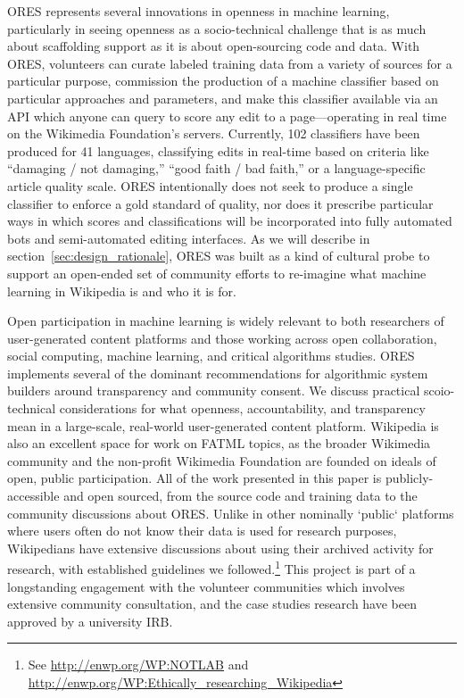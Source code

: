 ORES represents several innovations in openness in machine learning, particularly in seeing openness as a socio-technical challenge that is as much about scaffolding support as it is about open-sourcing code and data. With ORES, volunteers can curate labeled training data from a variety of sources for a particular purpose, commission the production of a machine classifier based on particular approaches and parameters, and make this classifier available via an API which anyone can query to score any edit to a page---operating in real time on the Wikimedia Foundation's servers. Currently, 102 classifiers have been produced for 41 languages, classifying edits in real-time based on criteria like ``damaging / not damaging,'' ``good faith / bad faith,'' or a language-specific article quality scale. ORES intentionally does not seek to produce a single classifier to enforce a gold standard of quality, nor does it prescribe particular ways in which scores and classifications will be incorporated into fully automated bots and semi-automated editing interfaces. As we will describe in section~\ref{sec:design_rationale}, ORES was built as a kind of cultural probe \cite{hutchinson2003technology} to support an open-ended set of community efforts to re-imagine what machine learning in Wikipedia is and who it is for.

Open participation in machine learning is widely relevant to both researchers of user-generated content platforms and those working across open collaboration, social computing, machine learning, and critical algorithms studies. ORES implements several of the dominant recommendations for algorithmic system builders around transparency and community consent\cite{crawford2016algorithm,diakopoulos2015algorithmic,sandvig2014auditing}. We discuss practical scoio-technical considerations for what openness, accountability, and transparency mean in a large-scale, real-world user-generated content platform. Wikipedia is also an excellent space for work on FATML topics, as the broader Wikimedia community and the non-profit Wikimedia Foundation are founded on ideals of open, public participation. All of the work presented in this paper is publicly-accessible and open sourced, from the source code and training data to the community discussions about ORES. Unlike in other nominally `public` platforms where users often do not know their data is used for research purposes, Wikipedians have extensive discussions about using their archived activity for research, with established guidelines we followed.\footnote{See \url{http://enwp.org/WP:NOTLAB} and \url{http://enwp.org/WP:Ethically_researching_Wikipedia}} This project is part of a longstanding engagement with the volunteer communities which involves extensive community consultation, and the case studies research have been approved by a university IRB.

